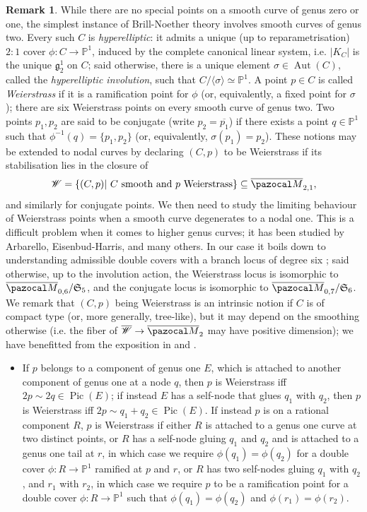 \documentclass[11pt]{amsart}
\newcommand{\PP}{\mathbb P}
\renewcommand{\to}{\rightarrow}
\newcommand{\oM}{\overline{\pazocal M}}
\newcommand{\Pic}{\operatorname{Pic}}
\newcommand{\Aut}{\operatorname{Aut}}
\theoremstyle{plain}
\theoremstyle{definition}
\newtheorem{rem}[thm]{Remark}
\begin{document}
\begin{rem}
 While there are no special points on a smooth curve of genus zero or one, the simplest instance of Brill-Noether theory involves smooth curves of genus two. Every such $C$ is \emph{hyperelliptic}: it admits a unique (up to reparametrisation) $2:1$ cover $\phi\colon C\to\PP^1$, induced by the complete canonical linear system, i.e. $\lvert K_C\rvert$ is the unique $\mathfrak g^1_2$ on $C$; said otherwise, there is a unique element $\sigma\in\Aut(C)$, called the \emph{hyperelliptic involution}, such that $C/\langle\sigma\rangle\simeq\PP^1$. A point $p\in C$ is called \emph{Weierstrass} if it is a ramification point for $\phi$ (or, equivalently, a fixed point for $\sigma$); there are six Weierstrass points on every smooth curve of genus two. Two points $p_1,p_2$ are said to be conjugate (write $p_2=\overline{p_1}$) if there exists a point $q\in\PP^1$ such that $\phi^{-1}(q)=\{p_1,p_2\}$ (or, equivalently, $\sigma(p_1)=p_2$). These notions may be extended to nodal curves by declaring $(C,p)$ to be Weierstrass if its stabilisation lies in the closure of \[\mathcal W=\{(C,p)|\ C\text{ smooth and } p \text{ Weierstrass}\}\subseteq\oM_{2,1},\]
 and similarly for conjugate points. We then need to study the limiting behaviour of Weierstrass points when a smooth curve degenerates to a nodal one. This is a difficult problem when it comes to higher genus curves; it has been studied by Arbarello, Eisenbud-Harris, and many others. In our case it boils down to understanding admissible double covers with a branch locus of degree six \cite{HarrisMumford}; said otherwise, up to the involution action, the Weierstrass locus is isomorphic to $\oM_{0,6}/\mathfrak S_5$, and the conjugate locus is isomorphic to  $\oM_{0,7}/\mathfrak S_6$. We remark that $(C,p)$ being Weierstrass is an intrinsic notion if $C$ is of compact type (or, more generally, tree-like), but it may depend on the smoothing otherwise (i.e. the fiber of $\overline{\mathcal W}\to\oM_2$ may have positive dimension); we have benefitted from the exposition in \cite[Appendix 2]{Diaz} and \cite[Proposition (3.0.6)]{Cukierman}.
 \begin{itemize}[leftmargin=.5cm]
  \item If $p$ belongs to a component of genus one $E$, which is attached to another component of genus one at a node $q$, then $p$ is Weierstrass iff $2p\sim 2q\in\Pic(E)$; if instead $E$ has a self-node that glues $q_1$ with $q_2$, then $p$ is Weierstrass iff $2p\sim q_1+q_2\in\Pic(E)$. If instead $p$ is on a rational component $R$, $p$ is Weierstrass if either $R$  is attached to a genus one curve at two distinct points, or $R$ has a self-node gluing $q_1$ and $q_2$ and is attached to a genus one tail at $r$, in which case we require $\phi(q_1)=\phi(q_2)$ for a double cover $\phi\colon R\to\PP^1$ ramified at $p$ and $r$, or $R$ has two self-nodes gluing $q_1$ with $q_2$, and $r_1$ with $r_2$, in which case we require $p$ to be a ramification point for a double cover $\phi\colon R\to\PP^1$ such that $\phi(q_1)=\phi(q_2)$ and $\phi(r_1)=\phi(r_2)$.
  

\end{itemize}
\end{rem}
\end{document}
